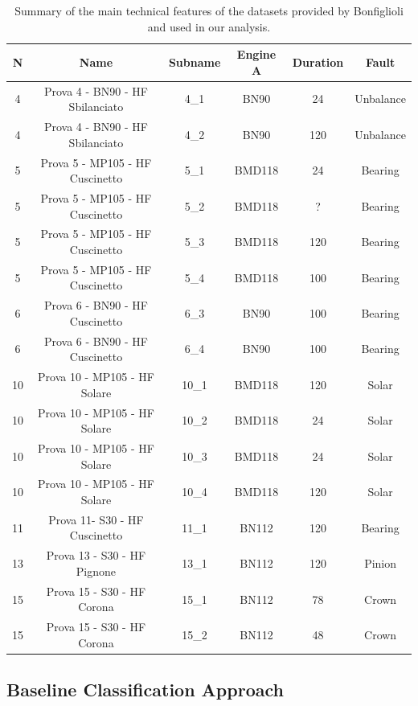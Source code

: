 \documentclass[../main.tex]{subfiles}
\begin{document}
\begin{table}[!ht]
	\centering
	\begin{tabular}{c c c c c c}
		\toprule
		\textbf{N} & \textbf{Name} & \textbf{Subname} & \textbf{Engine A} & \textbf{Duration} & \textbf{Fault}\\
		\midrule
		4  & Prova 4 - BN90 - HF Sbilanciato & 4\_1  & BN90   & 24  & Unbalance \\
		4  & Prova 4 - BN90 - HF Sbilanciato & 4\_2  & BN90   & 120 & Unbalance \\
		5  & Prova 5 - MP105 - HF Cuscinetto & 5\_1  & BMD118 & 24  & Bearing   \\
		5  & Prova 5 - MP105 - HF Cuscinetto & 5\_2  & BMD118 & ?   & Bearing   \\
		5  & Prova 5 - MP105 - HF Cuscinetto & 5\_3  & BMD118 & 120 & Bearing   \\
		5  & Prova 5 - MP105 - HF Cuscinetto & 5\_4  & BMD118 & 100 & Bearing   \\
		6  & Prova 6 - BN90 - HF Cuscinetto  & 6\_3  & BN90   & 100 & Bearing   \\
		6  & Prova 6 - BN90 - HF Cuscinetto  & 6\_4  & BN90   & 100 & Bearing   \\
		10 & Prova 10 - MP105 - HF Solare    & 10\_1 & BMD118 & 120 & Solar 	\\
		10 & Prova 10 - MP105 - HF Solare    & 10\_2 & BMD118 & 24  & Solar 	\\
		10 & Prova 10 - MP105 - HF Solare    & 10\_3 & BMD118 & 24  & Solar 	\\
		10 & Prova 10 - MP105 - HF Solare    & 10\_4 & BMD118 & 120 & Solar 	\\
		11 & Prova 11- S30 - HF Cuscinetto   & 11\_1 & BN112  & 120 & Bearing 	\\
		13 & Prova 13 - S30 - HF Pignone     & 13\_1 & BN112  & 120 & Pinion    \\
		15 & Prova 15 - S30 - HF Corona      & 15\_1 & BN112  & 78  & Crown		\\
		15 & Prova 15 - S30 - HF Corona      & 15\_2 & BN112  & 48  & Crown		\\
		\bottomrule
	\end{tabular}
	\caption{Summary of the main technical features of the datasets provided by Bonfiglioli and used in our analysis.}
	\label{tab:bonfiglioli_summary}
\end{table}



\subsection{Baseline Classification Approach}
\end{document}
